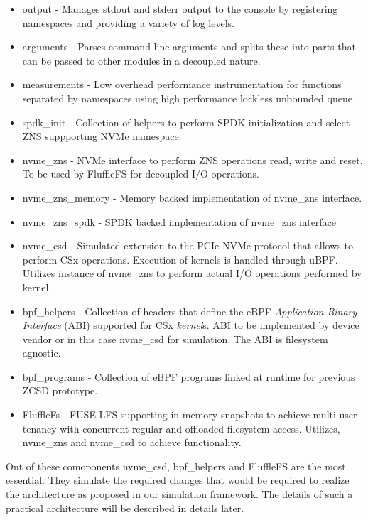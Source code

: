 \begin{itemize}
    \item output - Manages stdout and stderr output to the console by
    registering namespaces and providing a variety of log levels.
    \item arguments - Parses command line arguments and splits these into parts
    that can be passed to other modules in a decoupled nature. 
    \item measurements - Low overhead performance instrumentation for functions
    separated by namespaces using high performance lockless unbounded queue
    \cite{Michael1996SimpleFA}.
    \item spdk\_init - Collection of helpers to perform SPDK initialization and
    select ZNS suppporting NVMe namespace.
    \item nvme\_zns - NVMe interface to perform ZNS operations read, write and
    reset. To be used by FluffleFS for decoupled I/O operations.
    \item nvme\_zns\_memory - Memory backed implementation of nvme\_zns
    interface.
    \item nvme\_zns\_spdk - SPDK backed implementation of nvme\_zns interface
    \item nvme\_csd - Simulated extension to the PCIe NVMe protocol that allows
    to perform CSx operations. Execution of kernels is handled through uBPF.
    Utilizes instance of nvme\_zns to perform actual I/O operations performed by
    kernel.
    \item bpf\_helpers - Collection of headers that define the eBPF
    \textit{Application Binary Interface} (ABI) supported for CSx
    \textit{kernel}s. ABI to be implemented by device vendor or in this
    case nvme\_csd for simulation. The ABI is filesystem agnostic.
    \item bpf\_programs - Collection of eBPF programs linked at runtime for
    previous ZCSD \cite{lukken2021zcsd} prototype.
    \item FluffleFs - FUSE LFS supporting in-memory snapshots to achieve
    multi-user tenancy with concurrent regular and offloaded filesystem access.
    Utilizes, nvme\_zns and nvme\_csd to achieve functionality.
\end{itemize}

Out of these comoponents nvme\_csd, bpf\_helpers and FluffleFS are the most
essential. They simulate the required changes that would be required to
realize the architecture as proposed in our simulation framework. The details of
such a practical architecture will be described in details later.

